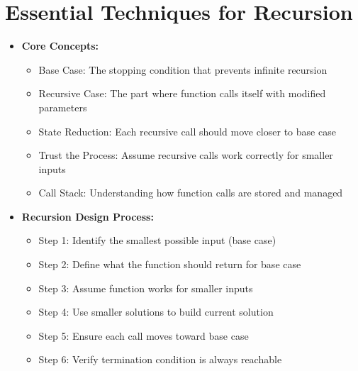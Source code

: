 \documentclass[a4paper,10pt]{book}
\begin{document}
\chapter{Essential Techniques for Recursion }
\label{sec:recursion}
\begin{itemize}[leftmargin=*]
    \item \textbf{Core Concepts:}
    \begin{itemize}
        \item Base Case: The stopping condition that prevents infinite recursion
        \item Recursive Case: The part where function calls itself with modified parameters
        \item State Reduction: Each recursive call should move closer to base case
        \item Trust the Process: Assume recursive calls work correctly for smaller inputs
        \item Call Stack: Understanding how function calls are stored and managed
    \end{itemize}

    \item \textbf{Recursion Design Process:}
    \begin{itemize}
        \item Step 1: Identify the smallest possible input (base case)
        \item Step 2: Define what the function should return for base case
        \item Step 3: Assume function works for smaller inputs
        \item Step 4: Use smaller solutions to build current solution
        \item Step 5: Ensure each call moves toward base case
        \item Step 6: Verify termination condition is always reachable
    \end{itemize}
\end{itemize}
\end{document}
